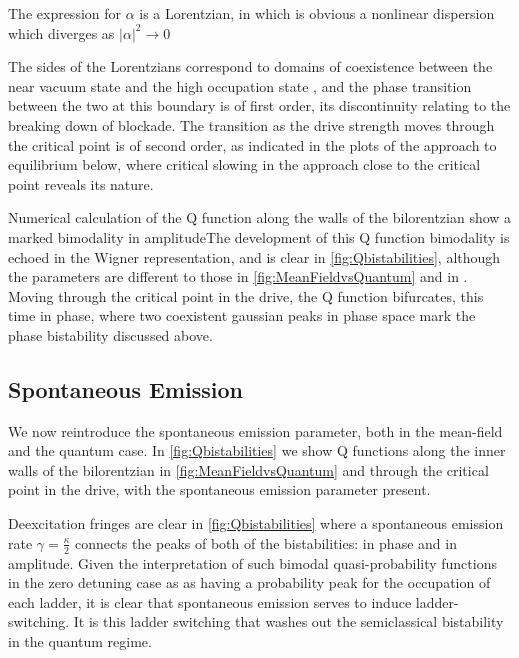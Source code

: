 The expression for $\alpha$ is a Lorentzian, in which is obvious a nonlinear dispersion which diverges as $|\alpha|^2 \rightarrow 0$


The sides of the Lorentzians correspond to domains of coexistence between the near vacuum state and the high occupation state \cite{Carmichael2015}, and the phase transition between the two at this boundary is of first order, its discontinuity relating to the breaking down of blockade. The transition as the drive strength moves through the critical point is of second order, as indicated in the plots of the approach to equilibrium below, where critical slowing in the approach close to the critical point reveals its nature.


Numerical calculation of the Q function along the walls of the bilorentzian show a marked bimodality in amplitudeThe development of this Q function bimodality is echoed in the Wigner representation, and is clear in \cref{fig:Qbistabilities}, although the parameters are different to those in \cref{fig:MeanFieldvsQuantum} and in \cite{Carmichael2015}. Moving through the critical point in the drive, the Q function bifurcates, this time in phase, where two coexistent gaussian peaks in phase space mark the phase bistability discussed above.

\subsection{Spontaneous Emission}

We now reintroduce the spontaneous emission parameter, both in the mean-field and the quantum case. In \ref{fig:Qbistabilities} we show Q functions along the inner walls of the bilorentzian in \ref{fig:MeanFieldvsQuantum} and through the critical point in the drive, with the spontaneous emission parameter present.

Deexcitation fringes are clear in \ref{fig:Qbistabilities} where a spontaneous emission rate $ \gamma = \frac{\kappa}{2}$ connects the peaks of both of the bistabilities: in phase and in amplitude. Given the interpretation of such bimodal quasi-probability functions in the zero detuning case as as having a probability peak for the occupation of each ladder, it is clear that spontaneous emission serves to induce ladder-switching. It is this ladder switching that washes out the semiclassical bistability in the quantum regime.


